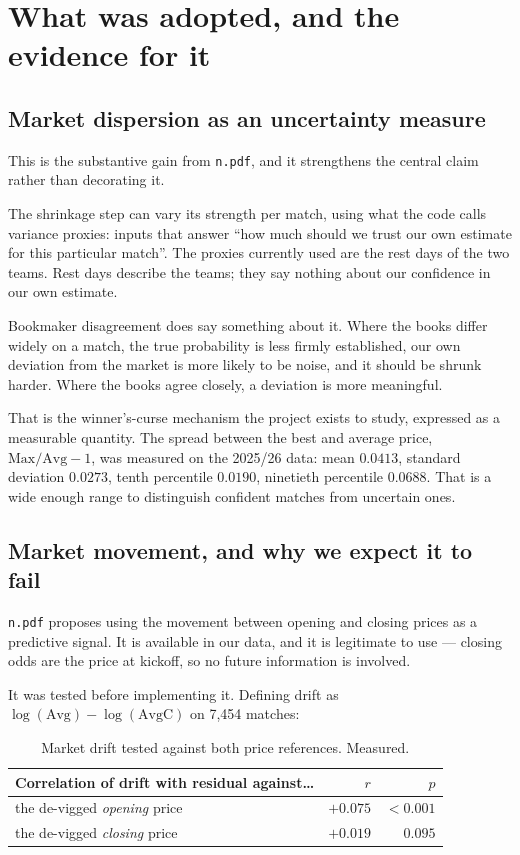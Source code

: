 \documentclass[11pt,a4paper]{article}
\newcommand{\code}[1]{\texttt{#1}}
\begin{document}
\section{What was adopted, and the evidence for it}

\subsection{Market dispersion as an uncertainty measure}

This is the substantive gain from \code{n.pdf}, and it strengthens the
central claim rather than decorating it.

The shrinkage step can vary its strength per match, using what the code calls
variance proxies: inputs that answer ``how much should we trust our own
estimate for this particular match''. The proxies currently used are the rest
days of the two teams. Rest days describe the teams; they say nothing about
our confidence in our own estimate.

Bookmaker disagreement does say something about it. Where the books differ
widely on a match, the true probability is less firmly established, our own
deviation from the market is more likely to be noise, and it should be shrunk
harder. Where the books agree closely, a deviation is more meaningful.

That is the winner's-curse mechanism the project exists to study, expressed as
a measurable quantity. The spread between the best and average price,
$\text{Max}/\text{Avg}-1$, was measured on the 2025/26 data: mean $0.0413$,
standard deviation $0.0273$, tenth percentile $0.0190$, ninetieth percentile
$0.0688$. That is a wide enough range to distinguish confident matches from
uncertain ones.

\subsection{Market movement, and why we expect it to fail}

\code{n.pdf} proposes using the movement between opening and closing prices as
a predictive signal. It is available in our data, and it is legitimate to use
--- closing odds are the price at kickoff, so no future information is
involved.

It was tested before implementing it. Defining drift as
$\log(\text{Avg}) - \log(\text{AvgC})$ on 7{,}454 matches:

\begin{table}[h]
\centering
\small
\begin{tabular}{@{}lrr@{}}
\toprule
\textbf{Correlation of drift with residual against\ldots} & \textbf{$r$} & \textbf{$p$} \\
\midrule
the de-vigged \emph{opening} price & $+0.075$ & $<0.001$ \\
the de-vigged \emph{closing} price & $+0.019$ & $0.095$ \\
\bottomrule
\end{tabular}
\caption{Market drift tested against both price references. Measured.}
\end{table}
\end{document}
